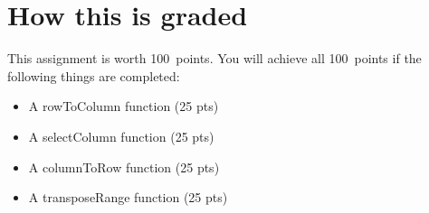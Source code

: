 \documentclass{article}
\newcommand{\AValue}{100}
\begin{document}
\section*{How this is graded}
This assignment is worth \AValue \ points. You will achieve all \AValue \   points if the following things are completed:
\begin{itemize}
    \item A rowToColumn function (25 pts)
    \item A selectColumn function (25 pts)
    \item A columnToRow function (25 pts)
    \item A transposeRange function (25 pts)
\end{itemize}
\end{document}

